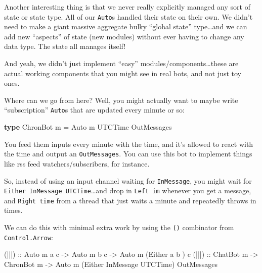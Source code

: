 \documentclass[]{article}
\newenvironment{Shaded}{\begin{snugshade}}{\end{snugshade}}
\newcommand{\DataTypeTok}[1]{\textcolor[rgb]{0.13,0.29,0.53}{#1}}
\newcommand{\FunctionTok}[1]{\textcolor[rgb]{0.00,0.00,0.00}{#1}}
\newcommand{\KeywordTok}[1]{\textcolor[rgb]{0.13,0.29,0.53}{\textbf{#1}}}
\newcommand{\NormalTok}[1]{#1}
\newcommand{\OtherTok}[1]{\textcolor[rgb]{0.56,0.35,0.01}{#1}}
\begin{document}
Another interesting thing is that we never really explicitly managed any sort of
state or state type. All of our \texttt{Auto}s handled their state on their own.
We didn't need to make a giant massive aggregate bulky ``global state''
type\ldots{}and we can add new ``aspects'' of state (new modules) without ever
having to change any data type. The state all manages itself!

And yeah, we didn't just implement ``easy'' modules/components\ldots{}these are
actual working components that you might see in real bots, and not just toy
ones.

Where can we go from here? Well, you might actually want to maybe write
``subscription'' \texttt{Auto}s that are updated every minute or so:

\begin{Shaded}
\begin{Highlighting}[]
\KeywordTok{type} \DataTypeTok{ChronBot}\NormalTok{ m }\FunctionTok{=} \DataTypeTok{Auto}\NormalTok{ m }\DataTypeTok{UTCTime} \DataTypeTok{OutMessages}
\end{Highlighting}
\end{Shaded}

You feed them inputs every minute with the time, and it's allowed to react with
the time and output an \texttt{OutMessages}. You can use this bot to implement
things like rss feed watchers/subscribers, for instance.

So, instead of using an input channel waiting for \texttt{InMessage}, you might
wait for \texttt{Either\ InMessage\ UTCTime}\ldots{}and drop in
\texttt{Left\ im} whenever you get a message, and \texttt{Right\ time} from a
thread that just waits a minute and repeatedly throws in times.

We can do this with minimal extra work by using the
\texttt{(\textbar{}\textbar{}\textbar{})} combinator from
\texttt{Control.Arrow}:

\begin{Shaded}
\begin{Highlighting}[]
\OtherTok{(|||) ::} \DataTypeTok{Auto}\NormalTok{ m a c }\OtherTok{->} \DataTypeTok{Auto}\NormalTok{ m b c }\OtherTok{->} \DataTypeTok{Auto}\NormalTok{ m (}\DataTypeTok{Either}\NormalTok{ a         b      ) c}
\OtherTok{(|||) ::} \DataTypeTok{ChatBot}\NormalTok{ m  }\OtherTok{->} \DataTypeTok{ChronBot}\NormalTok{ m }\OtherTok{->} \DataTypeTok{Auto}\NormalTok{ m (}\DataTypeTok{Either} \DataTypeTok{InMessage} \DataTypeTok{UTCTime}\NormalTok{) }\DataTypeTok{OutMessages}
\end{Highlighting}
\end{Shaded}
\end{document}
